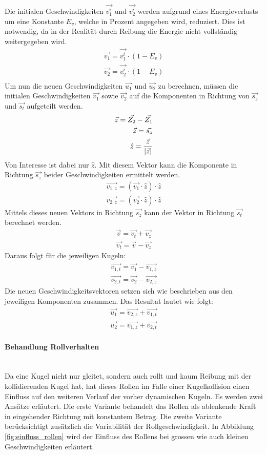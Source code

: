 Die initialen Geschwindigkeiten $\vec{v^i_1}$ und $\vec{v^i_2}$ werden aufgrund eines Energieverlusts um eine
Konstante $E_v$, welche in Prozent angegeben wird, reduziert. Dies ist notwendig, da in der Realität durch Reibung
die Energie nicht vollständig weitergegeben wird.
\begin{align}
    \vec{v_1} = \vec{v^i_1} \cdot (1 - E_v)\\
    \vec{v_2} = \vec{v^i_2} \cdot (1 - E_v)\\
\end{align}
Um nun die neuen Geschwindigkeiten $\vec{u_1}$ und $\vec{u_2}$ zu berechnen, müssen die initialen Geschwindigkeiten
$\vec{v_1}$ sowie $\vec{v_2}$ auf die Komponenten in Richtung von $\vec{s_z}$ und $\vec{s_t}$ aufgeteilt werden.
\begin{align}
    \vec{z} = \vec{Z_2} - \vec{Z_1}\\
    \vec{z} = \vec{s_z}\\
    \hat{z} = \frac{\vec{z}}{\lvert \vec{z} \rvert}
\end{align}
Von Interesse ist dabei nur $\hat{z}$.
Mit diesem Vektor kann die Komponente in Richtung $\vec{s_z}$ beider Geschwindigkeiten ermittelt werden.
\begin{align}
    \vec{v_{1,z}} = (\vec{v_1} \cdot \hat{z}) \cdot \hat{z}\\
    \vec{v_{2,z}} = (\vec{v_2} \cdot \hat{z}) \cdot \hat{z}
\end{align}
Mittels dieses neuen Vektors in Richtung $\vec{s_z}$ kann der Vektor in Richtung $\vec{s_t}$ berechnet werden.
\begin{align}
    \vec{v} = \vec{v_t} + \vec{v_z}\\
    \vec{v_t} = \vec{v} - \vec{v_z}
\end{align}
Daraus folgt für die jeweiligen Kugeln:
\begin{align}
    \vec{v_{1,t}} = \vec{v_1} - \vec{v_{1,z}}\\
    \vec{v_{2,t}} = \vec{v_2} - \vec{v_{2,z}}
\end{align}
Die neuen Geschwindigkeitsvektoren setzen sich wie beschrieben aus den jeweiligen Komponenten zusammen.
Das Resultat lautet wie folgt:
\begin{align}
    \vec{u_1} = \vec{v_{2,z}} + \vec{v_{1,t}}\\
    \vec{u_2} = \vec{v_{1,z}} + \vec{v_{2,t}}
\end{align}

\paragraph{Behandlung Rollverhalten} \hfill \\
Da eine Kugel nicht nur gleitet, sondern auch rollt und kaum Reibung mit der kollidierenden Kugel hat, hat dieses Rollen im
Falle einer Kugelkollision einen Einfluss auf den weiteren Verlauf der vorher dynamischen Kugeln.
Es werden zwei Ansätze erläutert. Die erste Variante behandelt das Rollen als ablenkende Kraft in eingehender Richtung mit konstantem Betrag.
Die zweite Variante berücksichtigt zusätzlich die Variabilität der Rollgeschwindigkeit. In Abbildung \ref{fig:einfluss_rollen} wird der Einfluss des
Rollens bei grossen wie auch kleinen Geschwindigkeiten erläutert.

